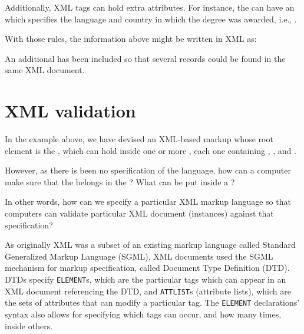 		Additionally, XML tags can hold extra attributes. For
		instance, the  can have an
		 which specifies the language and country
		in which the degree was awarded, i.e.,
		.
		
		 With those rules, the information above might be written
		in XML as:
		
		\begin{adjustwidth}{0.1\columnwidth}{0.1\columnwidth}
			\noindent{}
		\end{adjustwidth}
		
		An additional  has been included so that
		several  records could be found in the same
		XML document.
	
	\section{XML validation} %
	\label{sec:xml_validation}
		
		In the example above, we have devised an XML-based markup
		whose root element is the , which can hold
		inside one or more , each one containing
		, ,  and
		.
		
		 However, as there is been no specification of the
		language, how can a computer make sure that the
		 belongs in the ? What
		can be put inside a ?
		
		 In other words, how can we specify a particular XML markup
		language so that computers can validate particular XML
		document (instances) against that specification?
		
		 As originally XML was a subset of an existing markup
		language called Standard Generalized Markup Language
		(SGML), XML documents used the SGML mechanism for markup
		specification, called Document Type Definition (DTD). DTDs
		specify \texttt{ELEMENT}s, which are the particular tags
		which can appear in an XML document referencing the DTD,
		and \texttt{ATTLIST}s (attribute lists), which are the sets
		of attributes that can modify a particular tag. The
		\texttt{ELEMENT} declarations' syntax also allows for
		specifying which tags can occur, and how many times, inside
		others.
		
